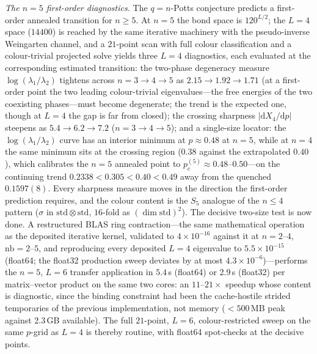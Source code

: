 \documentclass[aps,prx,reprint,superscriptaddress,nobibnotes,longbibliography]{revtex4-2}
\theoremstyle{remark}
\begin{document}
\emph{The $n=5$ first-order diagnostics.}  The $q=n$-Potts conjecture predicts a first-order annealed transition for $n\ge5$.  At $n=5$ the bond space is $120^{L/2}$; the $L=4$ space ($14400$) is reached by the same iterative machinery with the pseudo-inverse Weingarten channel, and a $21$-point scan with full colour classification and a colour-trivial projected solve yields three $L=4$ diagnostics, each evaluated at the corresponding estimated transition: the two-phase degeneracy measure $\log(\lambda_1/\lambda_2)$ tightens across $n=3\to4\to5$ as $2.15\to1.92\to1.71$ (at a first-order point the two leading colour-trivial eigenvalues---the free energies of the two coexisting phases---must become degenerate; the trend is the expected one, though at $L=4$ the gap is far from closed); the crossing sharpness $|\mathrm dX_4/\mathrm dp|$ steepens as $5.4\to6.2\to7.2$ ($n=3\to4\to5$); and a single-size locator: the $\log(\lambda_1/\lambda_2)$ curve has an interior minimum at $p\approx0.48$ at $n=5$, while at $n=4$ the same minimum sits at the crossing region ($0.38$ against the extrapolated $0.40$), which calibrates the $n=5$ annealed point to $p_c^{(5)}\approx0.48$--$0.50$---on the continuing trend $0.2338<0.305<0.40<0.49$ away from the quenched $0.1597(8)$.  Every sharpness measure moves in the direction the first-order prediction requires, and the colour content is the $S_5$ analogue of the $n\le4$ pattern ($\sigma$ in $\mathrm{std}\otimes\mathrm{std}$, $16$-fold as $(\dim\mathrm{std})^2$).  The decisive two-size test is now done.  A restructured BLAS ring contraction---the same mathematical operation as the deposited iterative kernel, validated to $4\times10^{-16}$ against it at $n=2$--$4$, $\mathrm{nb}=2$--$5$, and reproducing every deposited $L=4$ eigenvalue to $5.5\times10^{-15}$ (float64; the float32 production sweep deviates by at most $4.3\times10^{-6}$)---performs the $n=5$, $L=6$ transfer application in $5.4$\,s (float64) or 2.9\,s (float32) per matrix--vector product on the same two cores: an $11$--$21\times$ speedup whose content is diagnostic, since the binding constraint had been the cache-hostile strided temporaries of the previous implementation, not memory ($<500$\,MB peak against 2.3\,GB available).  The full $21$-point, $L=6$, colour-restricted sweep on the same $p$-grid as $L=4$ is thereby routine, with float64 spot-checks at the decisive points.
\end{document}
